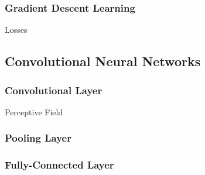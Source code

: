 \subsubsection{Gradient Descent Learning}
Losses

\subsection{Convolutional Neural Networks}
\subsubsection{Convolutional Layer}
Perceptive Field


\subsubsection{Pooling Layer}

\subsubsection{Fully-Connected Layer}